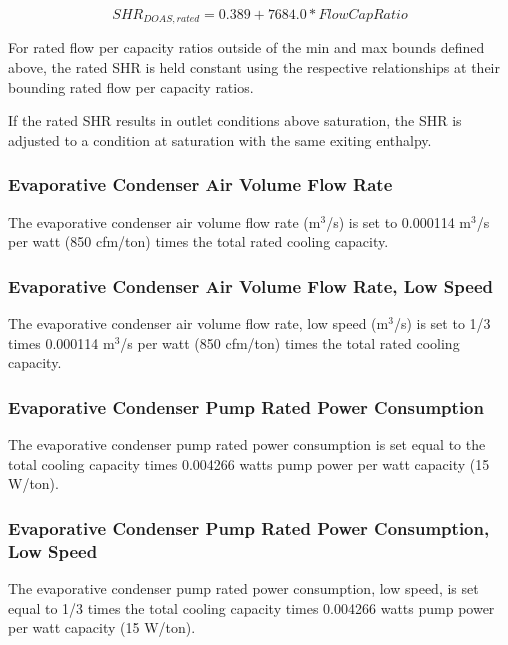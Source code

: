 \begin{equation}
SHR_{DOAS,rated} = 0.389 + 7684.0 * FlowCapRatio
\end{equation}

For rated flow per capacity ratios outside of the min and max bounds defined above, the rated SHR is held constant using the respective relationships at their bounding rated flow per capacity ratios.

If the rated SHR results in outlet conditions above saturation, the SHR is adjusted to a condition at saturation with the same exiting enthalpy.

\subsubsection{Evaporative Condenser Air Volume Flow Rate}\label{evaporative-condenser-air-volume-flow-rate}

The evaporative condenser air volume flow rate (m\(^{3}\)/s) is set to 0.000114 m\(^{3}\)/s per watt (850 cfm/ton) times the total rated cooling capacity.

\subsubsection{Evaporative Condenser Air Volume Flow Rate, Low Speed}\label{evaporative-condenser-air-volume-flow-rate-low-speed}

The evaporative condenser air volume flow rate, low speed (m\(^{3}\)/s) is set to 1/3 times 0.000114 m\(^{3}\)/s per watt (850 cfm/ton) times the total rated cooling capacity.

\subsubsection{Evaporative Condenser Pump Rated Power Consumption}\label{evaporative-condenser-pump-rated-power-consumption}

The evaporative condenser pump rated power consumption is set equal to the total cooling capacity times 0.004266 watts pump power per watt capacity (15 W/ton).

\subsubsection{Evaporative Condenser Pump Rated Power Consumption, Low Speed}\label{evaporative-condenser-pump-rated-power-consumption-low-speed}

The evaporative condenser pump rated power consumption, low speed, is set equal to 1/3 times the total cooling capacity times 0.004266 watts pump power per watt capacity (15 W/ton).

